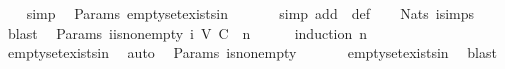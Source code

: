 \begin{isabellebody}
%
\isadelimproof
\ \ %
\endisadelimproof
%
\isatagproof
{}\isamarkupfalse%
\ simp%
\endisatagproof
{\isafoldproof}%
%
\isadelimproof
\isanewline
%
\endisadelimproof
\isanewline
{}\isamarkupfalse%
\ {\isacharparenleft}\ Params{\isacharparenright}\ empty{\isacharunderscore}set{\isacharunderscore}exists{\isacharunderscore}in{\isacharunderscore}{\isasymSigma}{\isacharcolon}\ {\isachardoublequoteopen}{\isasymemptyset}\ {\isasymin}\ {\isasymSigma}{\isachardoublequoteclose}\isanewline
%
\isadelimproof
\ \ %
\endisadelimproof
%
\isatagproof
{}\isamarkupfalse%
\ {\isacharparenleft}simp\ add{\isacharcolon}\ \ {\isasymSigma}{\isacharunderscore}def{\isacharparenright}\isanewline
\ \ \isamarkupfalse%
\ Nats{\isacharunderscore}{}\ {\isasymSigma}{\isacharunderscore}i{\isachardot}simps{\isacharparenleft}{}{\isacharparenright}\ \isamarkupfalse%
\ blast%
\endisatagproof
{\isafoldproof}%
%
\isadelimproof
\isanewline
%
\endisadelimproof
\isanewline
{}\isamarkupfalse%
\ {\isacharparenleft}\ Params{\isacharparenright}\ {\isasymSigma}{\isacharunderscore}i{\isacharunderscore}is{\isacharunderscore}non{\isacharunderscore}empty{\isacharcolon}\ {\isachardoublequoteopen}{\isasymSigma}{\isacharunderscore}i\ {\isacharparenleft}V{\isacharcomma}\ C{\isacharcomma}\ {\isasymepsilon}{\isacharparenright}\ n\ {\isasymnoteq}\ {\isasymemptyset}{\isachardoublequoteclose}\isanewline
%
\isadelimproof
\ \ %
\endisadelimproof
%
\isatagproof
{}\isamarkupfalse%
\ {\isacharparenleft}induction\ n{\isacharparenright}\isanewline
\ \ \isamarkupfalse%
\ empty{\isacharunderscore}set{\isacharunderscore}exists{\isacharunderscore}in{\isacharunderscore}{\isasymSigma}{\isacharunderscore}{}\ \isamarkupfalse%
\ auto%
\endisatagproof
{\isafoldproof}%
%
\isadelimproof
\isanewline
%
\endisadelimproof
\isanewline
{}\isamarkupfalse%
\ {\isacharparenleft}\ Params{\isacharparenright}\ {\isasymSigma}{\isacharunderscore}is{\isacharunderscore}non{\isacharunderscore}empty{\isacharcolon}\ {\isachardoublequoteopen}{\isasymSigma}\ {\isasymnoteq}\ {\isasymemptyset}{\isachardoublequoteclose}\isanewline
%
\isadelimproof
\ \ %
\endisadelimproof
%
\isatagproof
{}\isamarkupfalse%
\ empty{\isacharunderscore}set{\isacharunderscore}exists{\isacharunderscore}in{\isacharunderscore}{\isasymSigma}\ \isamarkupfalse%
\ blast%
\endisatagproof
{\isafoldproof}%
%
\isadelimproof
\isanewline

\end{isabellebody}
